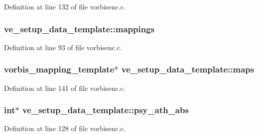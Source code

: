 Definition at line 132 of file vorbisenc.\+c.

\subsubsection[{\texorpdfstring{mappings}{mappings}}]{ ve\+\_\+setup\+\_\+data\+\_\+template\+::mappings}\hypertarget{structve__setup__data__template_a1fae0454f1291ca150015e931e19c9c9}{}\label{structve__setup__data__template_a1fae0454f1291ca150015e931e19c9c9}


Definition at line 93 of file vorbisenc.\+c.

\subsubsection[{\texorpdfstring{maps}{maps}}]{ {\bf vorbis\+\_\+mapping\+\_\+template}$\ast$ ve\+\_\+setup\+\_\+data\+\_\+template\+::maps}\hypertarget{structve__setup__data__template_ac7dcf3e49171d4960559c4cb32d08786}{}\label{structve__setup__data__template_ac7dcf3e49171d4960559c4cb32d08786}


Definition at line 141 of file vorbisenc.\+c.

\subsubsection[{\texorpdfstring{psy\+\_\+ath\+\_\+abs}{psy_ath_abs}}]{ {\bf int}$\ast$ ve\+\_\+setup\+\_\+data\+\_\+template\+::psy\+\_\+ath\+\_\+abs}\hypertarget{structve__setup__data__template_a39b6e113004df487a5155c4d7b3faee5}{}\label{structve__setup__data__template_a39b6e113004df487a5155c4d7b3faee5}


Definition at line 128 of file vorbisenc.\+c.

